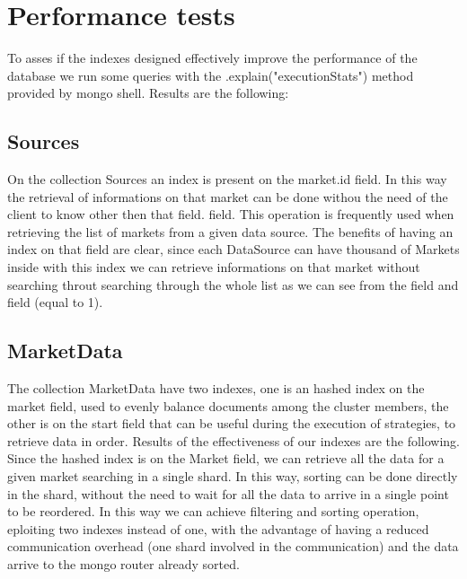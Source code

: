 \section{Performance tests}\label{sec:performancetests}
To asses if the indexes designed effectively improve the performance of the
database we run some queries with the .explain("executionStats") method provided
by mongo shell. Results are the following:

\subsection{Sources}
On the collection Sources an index is present on the market.id field. In this
way the retrieval of informations on that market can be done withou the need of
the client to know other then that field.
field. This operation is frequently used when retrieving the list of markets from a
given data source. The benefits of having an index on that field are clear,
since each DataSource can have thousand of Markets inside with this index we can
retrieve informations on that market without searching throut searching through
the whole list as we can see from the 
field and  field (equal to 1).



\subsection{MarketData}

The collection MarketData have two indexes, one is an hashed index on the market
field, used to evenly balance documents among the cluster
members, the other is on the start field that can be useful during the execution
of strategies, to retrieve data in order.
Results of the effectiveness of our indexes are the following.
Since the hashed index is on the Market field, we can retrieve all the data for
a given market searching in a single shard. In this way, sorting can be done
directly in the shard, without the need to wait for all the data to arrive in a
single point to be reordered. In this way we can achieve filtering and sorting
operation, eploiting two indexes instead of one, with the advantage of having a
reduced communication overhead (one shard involved in the communication) and the
data arrive to the mongo router already sorted.


